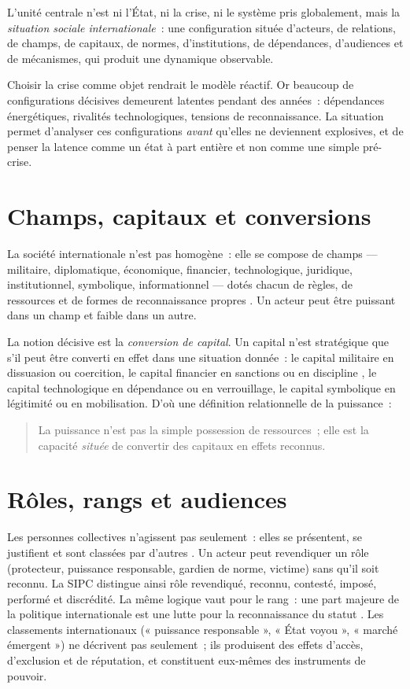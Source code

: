\documentclass[11pt,a4paper]{article}
\begin{document}
L'unité centrale n'est ni l'État, ni la crise, ni le système pris globalement, mais la
\emph{situation sociale internationale}~: une configuration située d'acteurs, de relations, de
champs, de capitaux, de normes, d'institutions, de dépendances, d'audiences et de mécanismes,
qui produit une dynamique observable.

Choisir la crise comme objet rendrait le modèle réactif. Or beaucoup de configurations
décisives demeurent latentes pendant des années~: dépendances énergétiques, rivalités
technologiques, tensions de reconnaissance. La situation permet d'analyser ces configurations
\emph{avant} qu'elles ne deviennent explosives, et de penser la latence comme un état à part
entière et non comme une simple pré-crise.

\section{Champs, capitaux et conversions}

La société internationale n'est pas homogène~: elle se compose de champs --- militaire,
diplomatique, économique, financier, technologique, juridique, institutionnel, symbolique,
informationnel --- dotés chacun de règles, de ressources et de formes de reconnaissance propres
\autocite{bourdieu1979}. Un acteur peut être puissant dans un champ et faible dans un autre.

La notion décisive est la \emph{conversion de capital}. Un capital n'est stratégique que s'il
peut être converti en effet dans une situation donnée~: le capital militaire en dissuasion ou
coercition, le capital financier en sanctions ou en discipline \autocite{strange1988}, le
capital technologique en dépendance ou en verrouillage, le capital symbolique en légitimité ou
en mobilisation. D'où une définition relationnelle de la puissance~:

\begin{quote}
La puissance n'est pas la simple possession de ressources~; elle est la capacité \emph{située}
de convertir des capitaux en effets reconnus.
\end{quote}

\section{Rôles, rangs et audiences}

Les personnes collectives n'agissent pas seulement~: elles se présentent, se justifient et sont
classées par d'autres \autocite{goffman1959}. Un acteur peut revendiquer un rôle (protecteur,
puissance responsable, gardien de norme, victime) sans qu'il soit reconnu. La SIPC distingue
ainsi rôle revendiqué, reconnu, contesté, imposé, performé et discrédité. La même logique vaut
pour le rang~: une part majeure de la politique internationale est une lutte pour la
reconnaissance du statut \autocite{honneth1995,ringmar1996,pouliot2016}. Les classements
internationaux (« puissance responsable », « État voyou », « marché émergent ») ne décrivent pas
seulement~; ils produisent des effets d'accès, d'exclusion et de réputation, et constituent
eux-mêmes des instruments de pouvoir.
\end{document}
